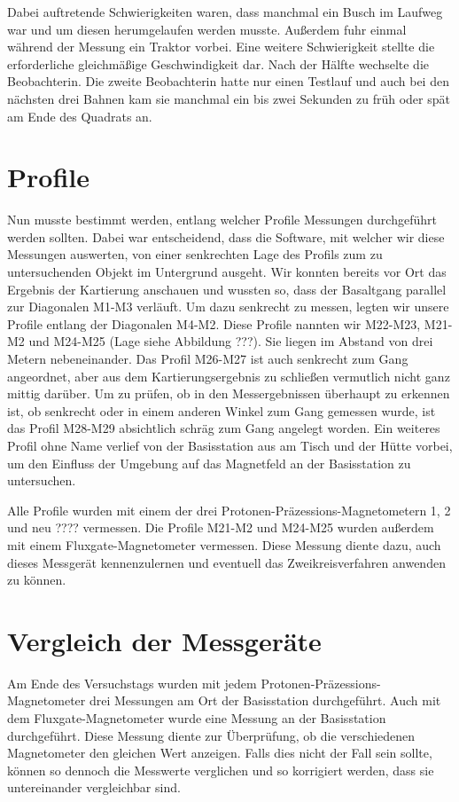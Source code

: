 Dabei auftretende Schwierigkeiten waren, dass manchmal ein Busch im Laufweg war und um diesen herumgelaufen werden musste. Außerdem fuhr einmal während der Messung ein Traktor vorbei. Eine weitere Schwierigkeit stellte die erforderliche gleichmäßige Geschwindigkeit dar. Nach der Hälfte wechselte die Beobachterin. Die zweite Beobachterin hatte nur einen Testlauf und auch bei den nächsten drei Bahnen kam sie manchmal ein bis zwei Sekunden zu früh oder spät am Ende des Quadrats an.

\section{Profile}

Nun musste bestimmt werden, entlang welcher Profile Messungen durchgeführt werden sollten. Dabei war entscheidend, dass die Software, mit welcher wir diese Messungen auswerten, von einer senkrechten Lage des Profils zum zu untersuchenden Objekt im Untergrund ausgeht.  Wir konnten bereits vor Ort das Ergebnis der Kartierung anschauen und wussten so, dass der Basaltgang parallel zur Diagonalen M1-M3 verläuft. Um dazu senkrecht zu messen, legten wir unsere Profile entlang der Diagonalen M4-M2. Diese Profile nannten wir M22-M23, M21-M2 und M24-M25 (Lage siehe Abbildung ???). Sie liegen im Abstand von drei Metern nebeneinander. Das Profil M26-M27 ist auch senkrecht zum Gang angeordnet, aber aus dem Kartierungsergebnis zu schließen vermutlich nicht ganz mittig darüber. Um zu prüfen, ob in den Messergebnissen überhaupt zu erkennen ist, ob senkrecht oder in einem anderen Winkel zum Gang gemessen wurde, ist das Profil M28-M29 absichtlich schräg zum Gang angelegt worden. Ein weiteres Profil ohne Name verlief von der Basisstation aus am Tisch und der Hütte vorbei, um den Einfluss der Umgebung auf das Magnetfeld an der Basisstation zu untersuchen.

Alle Profile wurden mit einem der drei Protonen-Präzessions-Magnetometern 1, 2 und neu ???? vermessen. Die Profile M21-M2 und M24-M25 wurden außerdem mit einem Fluxgate-Magnetometer vermessen. Diese Messung diente dazu, auch dieses Messgerät kennenzulernen und eventuell das Zweikreisverfahren anwenden zu können.

\section{Vergleich der Messgeräte}

Am Ende des Versuchstags wurden mit jedem Protonen-Präzessions-Magnetometer drei Messungen am Ort der Basisstation durchgeführt. Auch mit dem Fluxgate-Magnetometer wurde eine Messung an der Basisstation durchgeführt. Diese Messung diente zur Überprüfung, ob die verschiedenen Magnetometer den gleichen Wert anzeigen. Falls dies nicht der Fall sein sollte, können so dennoch die Messwerte verglichen und so korrigiert werden, dass sie untereinander vergleichbar sind.